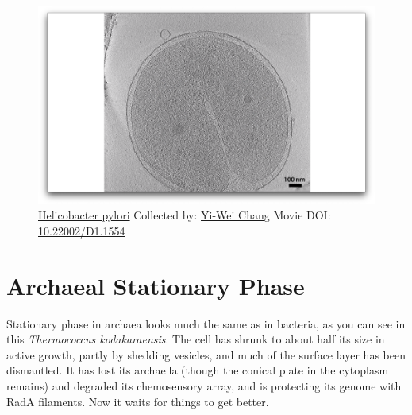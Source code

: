 \documentclass[]{tufte-book}
\begin{document}
\begin{figure}
\includegraphics{movie_stills/8_2} \caption[\protect\hyperlink{tree}{Helicobacter pylori} Collected by:
\protect\hyperlink{yi-wei_chang}{Yi-Wei Chang} Movie DOI:
\href{https://doi.org/10.22002/D1.1554}{10.22002/D1.1554}]{\protect\hyperlink{tree}{Helicobacter pylori} Collected by:
\protect\hyperlink{yi-wei_chang}{Yi-Wei Chang} Movie DOI:
\href{https://doi.org/10.22002/D1.1554}{10.22002/D1.1554}}\label{fig:8-2}
\end{figure}

\section{Archaeal Stationary Phase}\label{archaeal-stationary-phase}

Stationary phase in archaea looks much the same as in bacteria, as you
can see in this \emph{Thermococcus kodakaraensis}. The cell has shrunk
to about half its size in active growth, partly by shedding vesicles,
and much of the surface layer has been dismantled. It has lost its
archaella (though the conical plate in the cytoplasm remains) and
degraded its chemosensory array, and is protecting its genome with RadA
filaments. Now it waits for things to get better.
\end{document}
